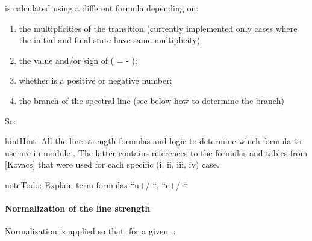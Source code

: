 \documentclass[letterpaper,10pt,english]{sphinxmanual}
\begin{document}
 is calculated using a different formula depending on:
\begin{enumerate}
\item {} 
the multiplicities of the transition (currently implemented only cases where the initial and
final state have same multiplicity)

\item {} 
the value and/or sign of ( =  - );

\item {} 
whether  is a positive or negative number;

\item {} 
the branch of the spectral line (see below how to determine the branch)

\end{enumerate}

So:

\begin{sphinxVerbatim}[commandchars=\\\{\}]
     

     
\end{sphinxVerbatim}

\begin{sphinxadmonition}{hint}{Hint:}
All the line strength formulas and logic to determine which formula to use are
in module . The latter contains references to the formulas and
tables from {[}Kovacs{]} that were used for each specific (i, ii, iii, iv) case.
\end{sphinxadmonition}

\begin{sphinxadmonition}{note}{\label{convmol:index-0}Todo:}
Explain term formulas “u+/-“, “c+/-“
\end{sphinxadmonition}


\paragraph{Normalization of the line strength}
\label{\detokenize{convmol:normalization-of-the-line-strength}}
Normalization is applied so that, for a given ,:
\end{document}
